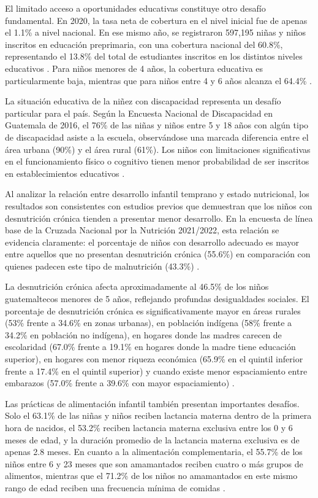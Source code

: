 El limitado acceso a oportunidades educativas constituye otro desafío 
fundamental. En 2020, la tasa neta de cobertura en el nivel inicial fue de 
apenas el 1.1\% a nivel nacional. En ese mismo año, se registraron 597,195 
niñas y niños inscritos en educación preprimaria, con una cobertura nacional 
del 60.8\%, representando el 13.8\% del total de estudiantes inscritos en los 
distintos niveles educativos \cite{PoliticaInfanciaGuate}. Para niños menores 
de 4 años, la cobertura educativa es particularmente baja, mientras que para 
niños entre 4 y 6 años alcanza el 64.4\% \cite{MineducEstadistica}.

La situación educativa de la niñez con discapacidad representa un desafío
particular para el país. Según la Encuesta Nacional de Discapacidad en Guatemala
de 2016, el 76\% de las niñas y niños entre 5 y 18 años con algún tipo de
discapacidad asiste a la escuela, observándose una marcada diferencia entre el
área urbana (90\%) y el área rural (61\%). Los niños con limitaciones
significativas en el funcionamiento físico o cognitivo tienen menor probabilidad
de ser inscritos en establecimientos educativos \cite{PoliticaInfanciaGuate}.

Al analizar la relación entre desarrollo infantil temprano y estado nutricional, 
los resultados son consistentes con estudios previos que demuestran que los 
niños con desnutrición crónica tienden a presentar menor desarrollo. En la 
encuesta de línea base de la Cruzada Nacional por la Nutrición 2021/2022, esta 
relación se evidencia claramente: el porcentaje de niños con desarrollo 
adecuado es mayor entre aquellos que no presentan desnutrición crónica (55.6\%) 
en comparación con quienes padecen este tipo de malnutrición (43.3\%) 
\cite{SESAN2022}.

La desnutrición crónica afecta aproximadamente al 46.5\% de los niños
guatemaltecos menores de 5 años, reflejando profundas desigualdades sociales.
El porcentaje de desnutrición crónica es significativamente mayor en áreas
rurales (53\% frente a 34.6\% en zonas urbanas), en población indígena (58\%
frente a 34.2\% en población no indígena), en hogares donde las madres carecen
de escolaridad (67.0\% frente a 19.1\% en hogares donde la madre tiene
educación superior), en hogares con menor riqueza económica (65.9\% en el
quintil inferior frente a 17.4\% en el quintil superior) y cuando existe menor
espaciamiento entre embarazos (57.0\% frente a 39.6\% con mayor espaciamiento)
\cite{EnMaternoInfantil}.

Las prácticas de alimentación infantil también presentan importantes desafíos.
Solo el 63.1\% de las niñas y niños reciben lactancia materna dentro de la
primera hora de nacidos, el 53.2\% reciben lactancia materna exclusiva entre
los 0 y 6 meses de edad, y la duración promedio de la lactancia materna
exclusiva es de apenas 2.8 meses. En cuanto a la alimentación complementaria,
el 55.7\% de los niños entre 6 y 23 meses que son amamantados reciben cuatro o
más grupos de alimentos, mientras que el 71.2\% de los niños no amamantados en
este mismo rango de edad reciben una frecuencia mínima de comidas
\cite{EnMaternoInfantil, PoliticaInfanciaGuate}.

